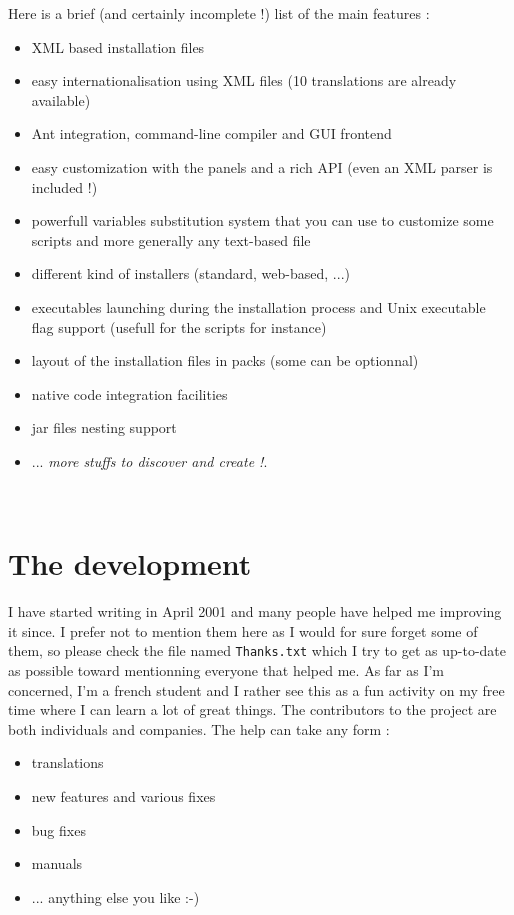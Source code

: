 Here is a brief (and certainly incomplete !) list of the main \IzPack features :
\begin{itemize}
	\item XML based installation files
	\item easy internationalisation using XML files (10 translations are already
	available)
	\item Ant integration, command-line compiler and GUI frontend
	\item easy customization with the panels and a rich API (even an XML parser is
	included !)
	\item powerfull variables substitution system that you can use to customize
	some scripts and more generally any text-based file
	\item different kind of installers (standard, web-based, ...)
	\item executables launching during the installation process and Unix
	executable flag support (usefull for the scripts for instance)
	\item layout of the installation files in packs (some can be optionnal)
	\item native code integration facilities
	\item jar files nesting support
	\item ... \textsl{more stuffs to discover and create !}.
\end{itemize}\

\section*{The development}

I have started writing \IzPack in April 2001 and many people have helped me
improving it since. I prefer not to mention them here as I would for sure forget
some of them, so please check the file named \texttt{Thanks.txt} which I try to
get as up-to-date as possible toward mentionning everyone that helped me. As far
as I'm concerned, I'm a french student and I rather see this as a fun activity
on my free time where I can learn a lot of great things. The contributors to the
project are both individuals and companies. The help can take any form :
\begin{itemize}
	\item translations
	\item new features and various fixes
	\item bug fixes
	\item manuals
	\item ... anything else you like :-)
\end{itemize}\

